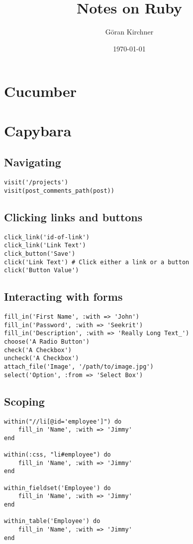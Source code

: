\documentclass[a4paper, captions=tableheading]{tufte-handout}
\author{Göran Kirchner}
\date{\today}
\title{Notes on Ruby}
\begin{document}
\maketitle
\tableofcontents


\section{Cucumber}
\label{sec:orgheadline1}

\section{Capybara}
\label{sec:orgheadline11}
\subsection{Navigating}
\label{sec:orgheadline2}
\begin{verbatim}
visit('/projects')
visit(post_comments_path(post))
\end{verbatim}

\subsection{Clicking links and buttons}
\label{sec:orgheadline3}
\begin{verbatim}
click_link('id-of-link')
click_link('Link Text')
click_button('Save')
click('Link Text') # Click either a link or a button
click('Button Value')
\end{verbatim}

\subsection{Interacting with forms}
\label{sec:orgheadline4}
\begin{verbatim}
fill_in('First Name', :with => 'John')
fill_in('Password', :with => 'Seekrit')
fill_in('Description', :with => 'Really Long Text_')
choose('A Radio Button')
check('A Checkbox')
uncheck('A Checkbox')
attach_file('Image', '/path/to/image.jpg')
select('Option', :from => 'Select Box')
\end{verbatim}

\subsection{Scoping}
\label{sec:orgheadline5}
\begin{verbatim}
within("//li[@id='employee']") do
	fill_in 'Name', :with => 'Jimmy'
end

within(:css, "li#employee") do
	fill_in 'Name', :with => 'Jimmy'
end

within_fieldset('Employee') do
	fill_in 'Name', :with => 'Jimmy'
end

within_table('Employee') do
	fill_in 'Name', :with => 'Jimmy'
end
\end{verbatim}
\end{document}
